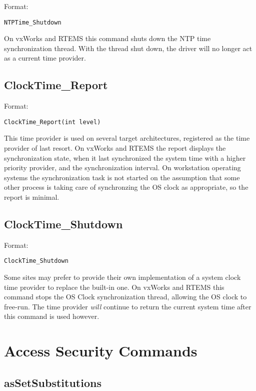 Format:

\begin{verbatim}
NTPTime_Shutdown
\end{verbatim}

On vxWorks and RTEMS this command shuts down the NTP time synchronization thread. With the thread shut down, the 
driver will no longer act as a current time provider.

\subsection{ClockTime\_Report}

Format:

\begin{verbatim}
ClockTime_Report(int level)
\end{verbatim}

This time provider is used on several target architectures, registered as the time provider of last resort. On vxWorks and 
RTEMS the report displays the synchronization state, when it last synchronized the system time with a higher priority 
provider, and the synchronization interval. On workstation operating systems the synchronization task is not started on the 
assumption that some other process is taking care of synchronzing the OS clock as appropriate, so the report is minimal.

\subsection{ClockTime\_Shutdown}

Format:

\begin{verbatim}
ClockTime_Shutdown
\end{verbatim}

Some sites may prefer to provide their own implementation of a system clock time provider to replace the built-in one. On 
vxWorks and RTEMS this command stops the OS Clock synchronization thread, allowing the OS clock to free-run.  The 
time provider \emph{will} continue to return the current system time after this command is used however.

\section{Access Security Commands}

\subsection{asSetSubstitutions}

